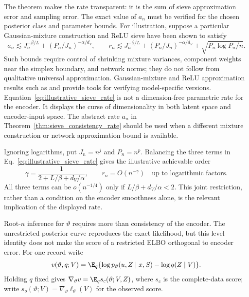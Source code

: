 The theorem makes the rate transparent: it is the sum of sieve approximation
error and sampling error.  The exact value of $a_n$ must be verified for the
chosen posterior class and parameter bounds.  For illustration, suppose a
particular Gaussian-mixture construction and ReLU sieve have been shown to
satisfy
\begin{equation}
 a_n\lesssim J_n^{-\beta/L}
 + (P_n/J_n)^{-\alpha/d_V},
 \qquad
 r_n\lesssim J_n^{-\beta/L}
 +(P_n/J_n)^{-\alpha/d_V}
 +\sqrt{P_n\log P_n/n}.
 \label{eq:illustrative_sieve_rate}
\end{equation}
Such bounds require control of shrinking mixture variances, component weights
near the simplex boundary, and network norms; they do not follow from
qualitative universal approximation.  Gaussian-mixture and ReLU approximation
results such as \citet{KruijerRousseauVdV2010} and
\citet{Yarotsky2018Deep} provide tools for verifying model-specific versions.
Equation~\eqref{eq:illustrative_sieve_rate} is not a dimension-free parametric
rate for the encoder.  It displays the curse of dimensionality in both latent
space and encoder-input space.  The abstract rate $a_n$ in
Theorem~\ref{thm:sieve_consistency_rate} should be used when a different
mixture construction or network approximation bound is available.

Ignoring logarithms, put $J_n=n^j$ and $P_n=n^p$.  Balancing the three terms
in Eq.~\eqref{eq:illustrative_sieve_rate} gives the illustrative achievable
order
 \[
 \gamma=\frac{1}{2+L/\beta+d_V/\alpha},\qquad
 r_n=O(n^{-\gamma})\quad\text{up to logarithmic factors}.
\]
All three terms can be $o(n^{-1/4})$ only if
$L/\beta+d_V/\alpha<2$.  This joint restriction, rather than a condition on
the encoder smoothness alone, is the relevant implication of the displayed
rate.

Root-$n$ inference for $\vartheta$ requires more than consistency of the
encoder.  The unrestricted posterior curve reproduces the exact likelihood,
but this level identity does not make the score of a restricted ELBO
orthogonal to encoder error.  For one record write
\[
 v(\vartheta,q;V)
 =\E_q\{\log p_\vartheta(u,Z\mid x,S)-\log q(Z\mid V)\}.
\]
Holding $q$ fixed gives
$\nabla_\vartheta v=\E_q s_c(\vartheta;V,Z)$, where $s_c$ is the complete-data
score; write $s_o(\vartheta;V)=\nabla_\vartheta\ell_\vartheta(V)$ for the
observed score.

